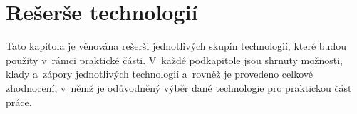 \chapter{Rešerše technologií}
\label{chap:technology-research}

Tato kapitola je věnována rešerši jednotlivých skupin technologií,
které budou použity v~rámci praktické části.
V~každé podkapitole jsou shrnuty možnosti, klady a~zápory jednotlivých
technologií a~rovněž je provedeno celkové zhodnocení,
v~němž je odůvodněný výběr dané technologie pro praktickou část práce.








